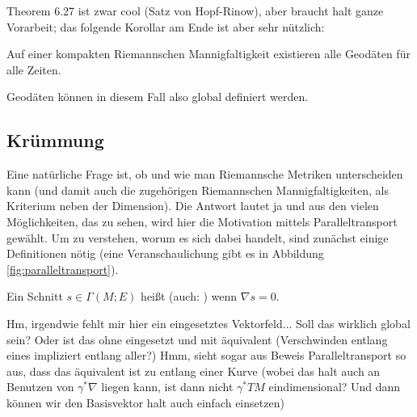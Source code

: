 \documentclass[../H_Analysis_main.tex]{subfiles}
\begin{document}
Theorem 6.27 ist zwar cool (Satz von Hopf-Rinow), aber braucht halt ganze Vorarbeit; das folgende Korollar am Ende ist aber sehr nützlich:



\begin{cor}
Auf einer kompakten Riemannschen Mannigfaltigkeit existieren alle Geodäten für alle Zeiten.
\end{cor}
Geodäten können in diesem Fall also global definiert werden.



		\subsection{Krümmung}
Eine natürliche Frage ist, ob und wie man Riemannsche Metriken unterscheiden kann (und damit auch die zugehörigen Riemannschen Mannigfaltigkeiten, als Kriterium neben der Dimension). Die Antwort lautet ja und aus den vielen Möglichkeiten, das zu sehen, wird hier die Motivation mittels Paralleltransport gewählt. Um zu verstehen, worum es sich dabei handelt, sind zunächst einige Definitionen nötig (eine Veranschaulichung gibt es in Abbildung \ref{fig:paralleltransport}).

\begin{defi}
Ein Schnitt $s \in \Gamma(M; E)$ heißt  (auch: ) wenn $\nabla s = 0$.
\end{defi}
Hm, irgendwie fehlt mir hier ein eingesetztes Vektorfeld... Soll das wirklich global sein? Oder ist das ohne eingesetzt und mit äquivalent (Verschwinden entlang eines impliziert entlang aller?) Hmm, sieht sogar aus Beweis Paralleltransport so aus, dass das äquivalent ist zu entlang einer Kurve (wobei das halt auch an Benutzen von $\gamma^* \nabla$ liegen kann, ist dann nicht $\gamma^* TM$ eindimensional? Und dann können wir den Basisvektor halt auch einfach einsetzen)

\iffalse %
\begin{bsp}

paralleler Schnitt für Linearen Zusammenhang ist Vektorfeld $\nabla_Y X = 0 \in \Gamma(M; T^*M \otimes TM)$ für ein beliebiges $Y \in \mathcal{X}(M)$, man schreibt oft auch einfach $\nabla X = 0$ in diesem Fall

paralleler Schnitt für Zusammenhang auf $E = TM^*$ ist 1-Form $\nabla_Y \omega = 0 \in \Gamma(M; TM \otimes T^*M)$ für ein beliebiges $Y \in \mathcal{X}(M)$


für Vektorfelder heißt das: $X$ ändert sich nicht wenn wir uns die Werte entlang eines Vektorfeldes $Y$ angucken, das nennt man dann parallel; allgemeiner, z.B.~eben für 1-Formen, ist da das Wort konstant vermutlich passender
\end{bsp}
\fi
\end{document}
